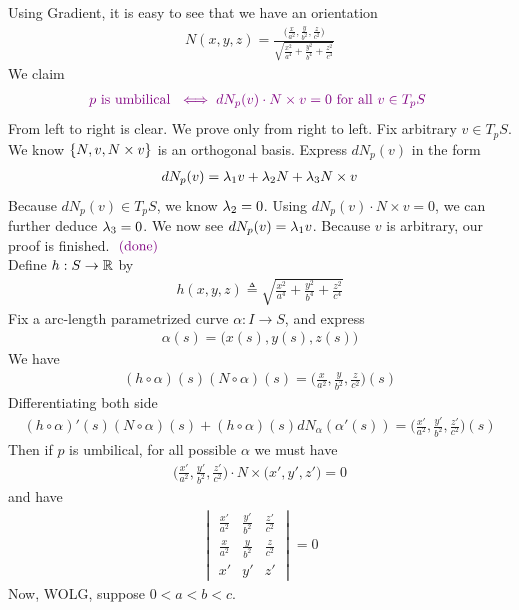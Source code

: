 \documentclass{report}
\begin{document}
Using Gradient, it is easy to see that we have an orientation 
\begin{align*}
N(x,y,z)= \frac{\Big(\frac{x}{a^2}, \frac{y}{b^2}, \frac{z}{c^2} \Big)}{\sqrt{\frac{x^2}{a^4}+ \frac{y^2}{b^4}+\frac{z^2}{c^4}} }
\end{align*}
We claim 
\begin{align*}
\textcolor{violet}{p\text{ is umbilical }\iff dN_p(v)\cdot N \times v=0\text{ for all $v\in T_pS$ }}
\end{align*}
From left to right is clear. We prove only from right to left. Fix arbitrary $v\in T_pS$. We know $\{ N,v,N\times v \}$ is an orthogonal basis. Express $dN_p(v)$ in the form 
\begin{align*}
dN_p(v)=\lambda_1 v+ \lambda_2 N + \lambda_3 N \times v 
\end{align*}
Because $dN_p(v)\in T_pS$, we know $\lambda _2=0$. Using $dN_p(v)\cdot N \times v=0$, we can further deduce $\lambda_3 =0$. We now see $dN_p(v)=\lambda _1 v$. Because $v$ is arbitrary, our proof is finished.  $\textcolor{violet}{\text{ (done) }}$\\

Define $h:S\rightarrow \mathbb{R}$ by 
\begin{align*}
h(x,y,z)\triangleq  \sqrt{\frac{x^2}{a^4}+\frac{y^2}{b^4}+\frac{z^2}{c^4}} 
\end{align*}
Fix a arc-length parametrized curve $\alpha :I\rightarrow S$, and express 
\begin{align*}
\alpha (s)=\Big(x(s),y(s),z(s) \Big)
\end{align*}
We have 
\begin{align*}
  (h\circ \alpha) (s) (N\circ \alpha )(s)= \Big(\frac{x}{a^2},\frac{y}{b^2},\frac{z}{c^2} \Big)(s)
\end{align*}
Differentiating both side
\begin{align*}
(h\circ \alpha )'(s)(N\circ \alpha )(s)+ (h \circ \alpha )(s) dN_{\alpha }(\alpha '(s))= \Big(\frac{x'}{a^2},\frac{y'}{b^2},\frac{z'}{c^2} \Big)(s)
\end{align*}
Then if $p$ is umbilical, for all possible $\alpha $ we must have 
\begin{align*}
\Big(\frac{x'}{a^2},\frac{y'}{b^2},\frac{z'}{c^2} \Big)\cdot N \times \Big(x',y',z' \Big)=0 
\end{align*}
and have 
\begin{align*}
  \begin{vmatrix} 
    \frac{x'}{a^2} & \frac{y'}{b^2} & \frac{z'}{c^2}\\
    \frac{x}{a^2} & \frac{y}{b^2} & \frac{z}{c^2}\\
    x' & y' & z'
  \end{vmatrix}=0 
\end{align*}
Now, WOLG, suppose $0<a<b<c$.\\
\end{document}
